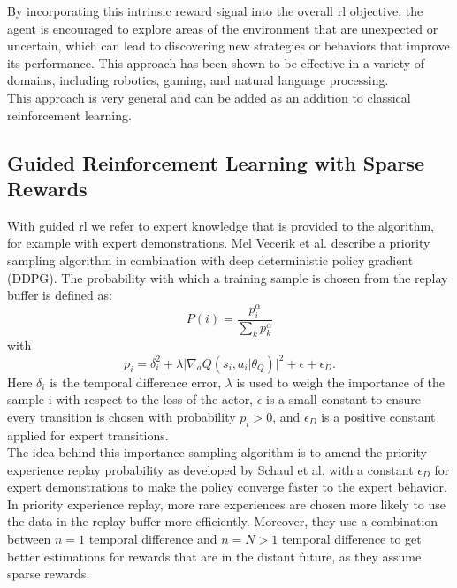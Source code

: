 By incorporating this intrinsic reward signal into the overall \ac{rl} objective, the agent is encouraged to explore areas of the environment that are 
unexpected or uncertain, which can lead to discovering new strategies or behaviors that improve its performance. This approach has been shown to be effective in a variety of 
domains, including robotics, gaming, and natural language processing.\\

This approach is very general and can be added as an addition to classical reinforcement learning.

\subsection{Guided Reinforcement Learning with Sparse Rewards}
\label{sec:rel_work_finetuning}
With guided \ac{rl} we refer to expert knowledge that is provided to the algorithm, for example with expert demonstrations.
Mel Vecerik et al. \cite{vecerik2018leveraging} describe a priority 
sampling algorithm in combination with deep deterministic policy gradient (DDPG). The probability with which a 
training sample is chosen from the replay buffer is defined as: 
\begin{equation}
    P(i) = \frac{p_i^\alpha}{\sum\limits_{k} p_k^\alpha}
\end{equation}
with 
\begin{equation}
    p_i = \delta_{i}^2 + \lambda \lvert \nabla_a Q(s_i, a_i \vert \theta_Q) \rvert^2 + \epsilon + \epsilon_{D}.
\end{equation}
Here $\delta_{i}$ is the temporal difference error, $\lambda$ is used to weigh the importance of the sample i with respect to the loss of the actor, 
$\epsilon$ is a small constant to ensure every transition is chosen with probability $p_i > 0$, and $\epsilon_D$ is a positive constant applied for expert transitions.\\
The idea behind this importance sampling algorithm is to amend the priority experience replay probability as developed by Schaul et al. \cite{schaul2016prioritized} 
with a constant $\epsilon_{D}$ for expert demonstrations to make the policy converge faster to the expert behavior. In priority experience replay, more rare 
experiences are chosen more likely to use the data in the replay buffer more efficiently. Moreover, they use a combination between $n=1$ temporal difference and 
$n=N > 1$ temporal difference to get better estimations for rewards that are in the distant future, as they assume sparse rewards.\\
